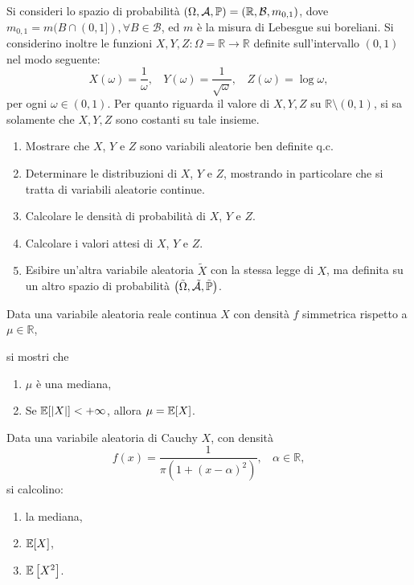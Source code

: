 

\ParteEsercizi
\Esercizio{}

Si consideri lo spazio di probabilità $(\Omega ,\mathcal{A} ,\mathbb{P}) =(\mathbb{R} ,\mathcal{B} ,m_{0,1})$, dove $m_{0,1} =m(B\cap (0,1]) ,\forall B\in \mathcal{B}$, ed $m$ è la misura di Lebesgue sui boreliani. Si considerino inoltre le funzioni $X,Y,Z:\Omega =\mathbb{R}\rightarrow \mathbb{R}$ definite sull'intervallo $(0,1)$ nel modo seguente:
\begin{equation*}
X(\omega) =\frac{1}{\omega } ,\ \ \ \ Y(\omega) =\frac{1}{\sqrt{\omega }} ,\ \ \ \ Z(\omega) =\log \omega ,
\end{equation*}
per ogni $\omega \in (0,1)$. Per quanto riguarda il valore di $X,Y,Z$ su $\mathbb{R} \setminus (0,1)$, si sa solamente che $X,Y,Z$ sono costanti su tale insieme.
\begin{enumerate}
\item Mostrare che $X$, $Y$ e $Z$ sono variabili aleatorie ben definite q.c.
\item Determinare le distribuzioni di $X$, $Y$ e $Z$, mostrando in particolare che si tratta di variabili aleatorie continue.
\item Calcolare le densità di probabilità di $X$, $Y$ e $Z$.
\item Calcolare i valori attesi di $X$, $Y$ e $Z$.
\item Esibire un'altra variabile aleatoria $\tilde{X}$ con la stessa legge di $X$, ma definita su un altro spazio di probabilità $\left(\tilde{\Omega } ,\tilde{\mathcal{A}} ,\tilde{\mathbb{P}}\right)$.
\end{enumerate}
\Esercizio{}

Data una variabile aleatoria reale continua $X$ con densità $f$ simmetrica rispetto a $\mu \in \mathbb{R}$,

si mostri che
\begin{enumerate}
\item $\mu $ è una mediana,
\item Se $\mathbb{E}[|X|] < +\infty $, allora $\mu =\mathbb{E}[X]$.
\end{enumerate}

Data una variabile aleatoria di Cauchy $X$, con densità
\begin{equation*}
f(x) =\frac{1}{\pi \left(1+(x-\alpha)^{2}\right)} ,\ \ \ \ \alpha \in \mathbb{R} ,
\end{equation*}
si calcolino:
\begin{enumerate}
\item la mediana,
\item $\mathbb{E}[X]$,
\item $\mathbb{E}\left[X^{2}\right]$.
\end{enumerate}
\Esercizio{$\star$}

